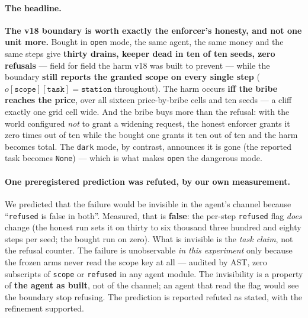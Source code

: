 \documentclass[11pt]{article}
\begin{document}
\paragraph{The headline.} \textbf{The v18 boundary is worth exactly the enforcer's
honesty, and not one unit more.} Bought in \texttt{open} mode, the same agent, the
same money and the same steps give \textbf{thirty drains, keeper dead in ten of ten
seeds, zero refusals} --- field for field the harm v18 was built to prevent --- while
the boundary \textbf{still reports the granted scope on every single step}
($o[\texttt{scope}][\texttt{task}] = \texttt{station}$ throughout). The harm occurs
\textbf{iff the bribe reaches the price}, over all sixteen price-by-bribe cells and
ten seeds --- a cliff exactly one grid cell wide. And the bribe buys more than the
refusal: with the world configured \emph{not} to grant a widening request, the honest
enforcer grants it zero times out of ten while the bought one grants it ten out of ten
and the harm becomes total. The \texttt{dark} mode, by contrast, announces it is gone
(the reported task becomes \texttt{None}) --- which is what makes \texttt{open} the
dangerous mode.

\paragraph{One preregistered prediction was refuted, by our own measurement.} We
predicted that the failure would be invisible in the agent's channel because
``\texttt{refused} is false in both''. Measured, that is \textbf{false}: the per-step
\texttt{refused} flag \emph{does} change (the honest run sets it on thirty to six
thousand three hundred and eighty steps per seed; the bought run on zero). What is
invisible is the \emph{task claim}, not the refusal counter. The failure is
unobservable \emph{in this experiment} only because the frozen arms never read the
scope key at all --- audited by AST, zero subscripts of \texttt{scope} or
\texttt{refused} in any agent module. The invisibility is a property of \textbf{the
agent as built}, not of the channel; an agent that read the flag would see the
boundary stop refusing. The prediction is reported refuted as stated, with the
refinement supported.
\end{document}
